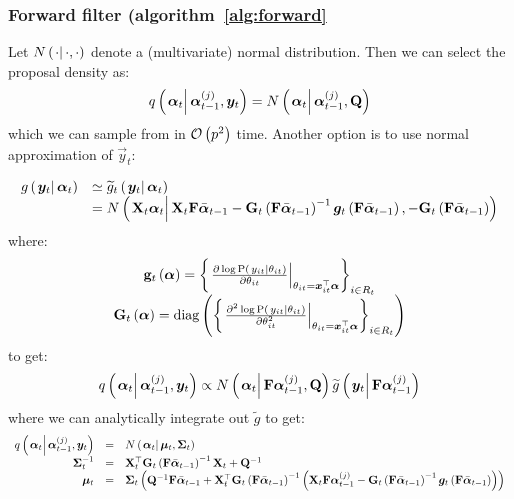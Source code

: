 \subsubsection*{Forward filter (algorithm~\ref{alg:forward}}
Let $\normalC{\cdot}{\cdot}{\cdot}$ denote a (multivariate) normal distribution. Then we can select the proposal density as:
\begin{equation}
	\IDC{\vec{\alpha}_t}{\partic{\vec{\alpha}}{t-1}{j}, \vec{y}_t} = %
		\normalC{\vec{\alpha}_t}{\partic{\vec{\alpha}}{t-1}{j}}{\mat{Q}}
\end{equation}%
%
which we can sample from in $\mathcal{O}\left( p^2\right)$ time. Another option is to use normal approximation of $\vec{y}_t$:

\begin{equation}\begin{array}{cl}
	\optorC{g}{\vec{y}_t}{\vec{\alpha}_t} & \simeq  \optorC{\widetilde{g}_t}{\vec{y}_t}{\vec{\alpha}_t} \\ &= %
		\normalC{
			\mat{X}_t\vec{\alpha}_t
		}{ %
			\mat{X}_t\mat{F}\vecb{\alpha}_{t - 1} - 
			\mat{G}_t\Lparen{\mat{F}\vecb{\alpha}_{t - 1}}^{-1}
			\vec{g}_t\Lparen{\mat{F}\vecb{\alpha}_{t - 1}}		
		}{ %
			- \mat{G}_t\Lparen{\mat{F}\vecb{\alpha}_{t - 1}}
		}
\end{array}\end{equation}
%
% 
where:
\begin{equation}\begin{array}{c}
\mat{g}_t\Lparen{\vec{\alpha}} = 
		\Lbrace{\left.\frac{
		\partial \log \propC{y_{it}}{\theta_{it}}
	}{
		\partial\theta_{it}
	}\right|_{\theta_{it} = \vec{x}_{it}^\top\vec{\alpha}} }_{i \in R_t} \\
%
	\mat{G}_t\Lparen{\vec{\alpha}} = 
		\diag{\Lbrace{\left.\frac{
		\partial^2 \log \propC{y_{it}}{\theta_{it}}
	}{
		\partial\theta_{it}^2
	}\right|_{\theta_{it} = \vec{x}_{it}^\top\vec{\alpha}} }_{i \in R_t}}
\end{array}\end{equation}
%
%
to get:
\begin{equation}
	\IDC{\vec{\alpha}_t}{\partic{\vec{\alpha}}{t-1}{j}, \vec{y}_t} \propto %
		\normalC{\vec{\alpha}_t}{\mat{F}\partic{\vec{\alpha}}{t-1}{j}}{\mat{Q}}
		\optorC{\widetilde{g}}{\vec{y}_t}{\mat{F}\partic{\vec{\alpha}}{t-1}{j}}
\end{equation}
%
%
where we can analytically integrate out $\widetilde{g}$ to get:
\begin{equation}\begin{array}{rcl}
	\IDC{\vec{\alpha}_t}{\partic{\vec{\alpha}}{t-1}{j}, \vec{y}_t} &=&  %
		\normalC{\vec{\alpha}_t}{\vec{\mu}_t}{\mat{\Sigma}_t} \\
%
	\mat{\Sigma}_t^{-1} &=& \mat{X}_t^\top \mat{G}_t\Lparen{\mat{F}\vecb{\alpha}_{t - 1}}^{-1}\mat{X}_t + \mat{Q}^{-1}  \\
%
	\vec{\mu}_t &=& \mat{\Sigma}_t\Lparen{
		\mat{Q}^{-1}\mat{F}\vecb{\alpha}_{t - 1} + 
		\mat{X}_t^\top \mat{G}_t\Lparen{\mat{F}\vecb{\alpha}_{t - 1}}^{-1}
		\Lparen{
			\mat{X}_t\mat{F}\partic{\vec{\alpha}}{t-1}{j} - 
			\mat{G}_t\Lparen{\mat{F}\vecb{\alpha}_{t - 1}}^{-1}
			\vec{g}_t\Lparen{\mat{F}\vecb{\alpha}_{t - 1}}
		}
	}
\end{array}\end{equation}
